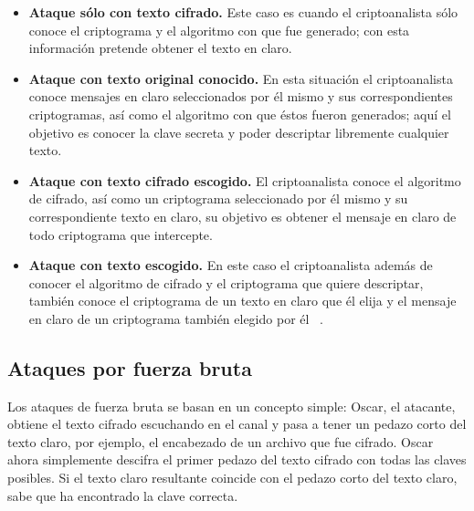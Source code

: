  \begin{itemize} 
	\item \textbf{Ataque sólo con texto cifrado. }
Este caso es cuando el criptoanalista sólo conoce el criptograma y el algoritmo con que fue generado; con esta información pretende obtener el texto en claro.

	\item \textbf{Ataque con texto original conocido. }
En esta situación el criptoanalista conoce mensajes en claro seleccionados por él mismo y sus correspondientes criptogramas, así como el algoritmo con que éstos fueron generados; aquí el objetivo es conocer la clave secreta y poder descriptar libremente cualquier texto.

	\item \textbf{Ataque con texto cifrado escogido. }
El criptoanalista conoce el algoritmo de cifrado, así como un criptograma seleccionado por él mismo y su correspondiente texto en claro, su objetivo es obtener el mensaje en claro de todo criptograma que intercepte.

	\item \textbf{Ataque con texto escogido. }
En este caso el criptoanalista además de conocer el algoritmo de cifrado y el criptograma que quiere descriptar, también conoce el criptograma de un texto en claro que él elija y el mensaje en claro de un criptograma también elegido por él ~\cite{ataques}.
 \end{itemize}


\subsection{Ataques por fuerza bruta}

Los ataques de fuerza bruta se basan en un concepto simple: Oscar, el atacante, obtiene el texto cifrado escuchando en el canal y pasa a tener un pedazo corto del texto claro, por ejemplo, el encabezado de un archivo que fue cifrado. Oscar ahora simplemente descifra el primer pedazo del texto cifrado con todas las claves posibles. Si el texto claro resultante coincide con el pedazo corto del texto claro, sabe que ha encontrado la clave correcta.\\

